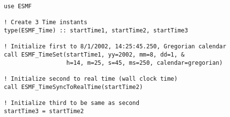 
\begin{verbatim}
use ESMF

! Create 3 Time instants
type(ESMF_Time) :: startTime1, startTime2, startTime3

! Initialize first to 8/1/2002, 14:25:45.250, Gregorian calendar
call ESMF_TimeSet(startTime1, yy=2002, mm=8, dd=1, &
                  h=14, m=25, s=45, ms=250, calendar=gregorian)

! Initialize second to real time (wall clock time)
call ESMF_TimeSyncToRealTime(startTime2)

! Initialize third to be same as second
startTime3 = startTime2

\end{verbatim}
